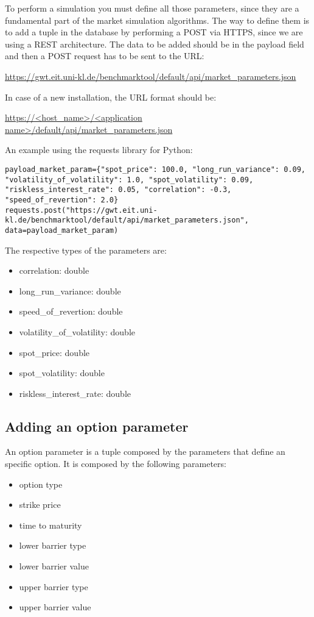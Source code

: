 \documentclass[11pt,a4paper]{article}
\begin{document}
To perform a simulation you must define all those parameters, since they are a fundamental part of the market simulation algorithms.
The way to define them is to add a tuple in the database by performing a POST via HTTPS, since we are using a REST architecture.
The data to be added should be in the payload field and then a POST request has to be sent to the URL: 

\noindent\url{https://gwt.eit.uni-kl.de/benchmarktool/default/api/market_parameters.json}

In case of a new installation, the URL format should be:

\noindent\url{https://<host_name>/<application name>/default/api/market_parameters.json}

An example using the requests library for Python:
\begin{lstlisting}
payload_market_param={"spot_price": 100.0, "long_run_variance": 0.09, "volatility_of_volatility": 1.0, "spot_volatility": 0.09, "riskless_interest_rate": 0.05, "correlation": -0.3, "speed_of_revertion": 2.0}
requests.post("https://gwt.eit.uni-kl.de/benchmarktool/default/api/market_parameters.json", data=payload_market_param)
\end{lstlisting}

The respective types of the parameters are:
\begin{itemize}
	\item correlation: double
	\item long\_run\_variance: double
	\item speed\_of\_revertion: double
	\item volatility\_of\_volatility: double
	\item spot\_price: double
	\item spot\_volatility: double
	\item riskless\_interest\_rate: double
\end{itemize}

\subsection{Adding an option parameter}

An option parameter is a tuple composed by the parameters that define an specific option.
It is composed by the following parameters:
\begin{itemize}
	\item option type
	\item strike price
	\item time to maturity
	\item lower barrier type
	\item lower barrier value
	\item upper barrier type
	\item upper barrier value
\end{itemize}
\end{document}
